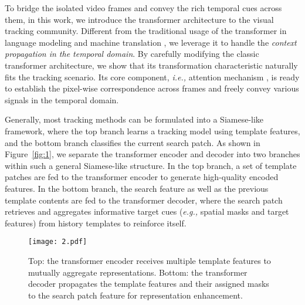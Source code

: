 \documentclass[10pt,twocolumn,letterpaper]{article}
\begin{document}
To bridge the isolated video frames and convey the rich temporal cues across them, in this work, we introduce the transformer architecture \cite{Transformer} to the visual tracking community.
Different from the traditional usage of the transformer in language modeling and machine translation \cite{Transformer,BERT}, we leverage it to handle the \emph{context propagation in the temporal domain}.
By carefully modifying the classic transformer architecture, we show that its transformation characteristic naturally fits the tracking scenario.
Its core component, \emph{i.e.,} attention mechanism \cite{Transformer,nonlocal}, is ready to establish the pixel-wise correspondence across frames and freely convey various signals in the temporal domain. 



Generally, most tracking methods \cite{SiamFC,CFNet,SiamRPN,CREST,ATOM,DiMP} can be formulated into a Siamese-like framework, where the top branch learns a tracking model using template features, and the bottom branch classifies the current search patch. 
As shown in Figure~\ref{fig:1}, we separate the transformer encoder and decoder into two branches within such a general Siamese-like structure. 
In the top branch, a set of template patches are fed to the transformer encoder to generate high-quality encoded features.
In the bottom branch, the search feature as well as the previous template contents are fed to the transformer decoder, where the search patch retrieves and aggregates informative target cues (\emph{e.g.,} spatial masks and target features) from history templates to reinforce itself.  




\begin{figure}
	\centering
	\texttt{[image: 2.pdf]}
	\caption{Top: the transformer encoder receives multiple template features to mutually aggregate representations. Bottom: the transformer decoder propagates the template features and their assigned masks to the search patch feature for representation enhancement.}\label{fig:2}
	\vspace{-0.1in}
\end{figure}
\end{document}
